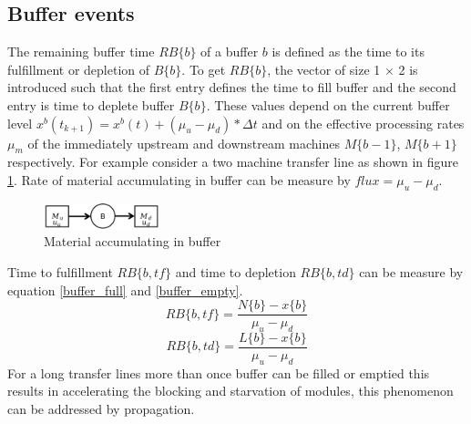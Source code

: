 \subsection{Buffer events}
The remaining buffer time $RB \lbrace b \rbrace$ of a buffer $b$ is defined as  the time to its fulfillment or depletion of $B \lbrace b \rbrace$. To get  $RB \lbrace b \rbrace$, the vector of size 1 $\times$ 2 is introduced such that the first entry defines the time to fill buffer and the second entry is time to deplete buffer $B \lbrace b \rbrace$. These values depend on  the current buffer level $x^b(t_{k+1}) = x^b(t) + (\mu_{u} - \mu_{d}) * \Delta t$  and on the effective processing rates $\mu_m$ of  the immediately upstream and downstream machines $M \lbrace b-1\rbrace$, $M \lbrace b+1 \rbrace$ respectively. For example consider a two machine transfer line as shown in figure \ref{fig:two_machine_line}. Rate of material accumulating in buffer can be measure by $flux = \mu_u - \mu_d$. 
\begin{figure}[htbp]
    \centering
    \includegraphics[width=0.3\textwidth]{figures/two_machine_line.png} 
    \caption{Material accumulating in buffer}
    \label{fig:two_machine_line}
\end{figure}
Time to fulfillment $RB \lbrace b, tf \rbrace$ and time to depletion $RB \lbrace b, td \rbrace$ can be measure by equation \ref{buffer_full} and \ref{buffer_empty}.
\begin{equation}\label{buffer_full}
    RB \lbrace b, tf \rbrace = \frac{N \lbrace b \rbrace - x \lbrace b \rbrace}{\mu_u - \mu_d}
\end{equation}
\begin{equation}\label{buffer_empty}
    RB \lbrace b, td \rbrace = \frac{L \lbrace b \rbrace - x \lbrace b \rbrace}{\mu_u - \mu_d}
\end{equation}
For a long transfer lines more than once buffer can be filled or emptied this results in accelerating the blocking and starvation of modules, this phenomenon can be addressed by propagation. 

